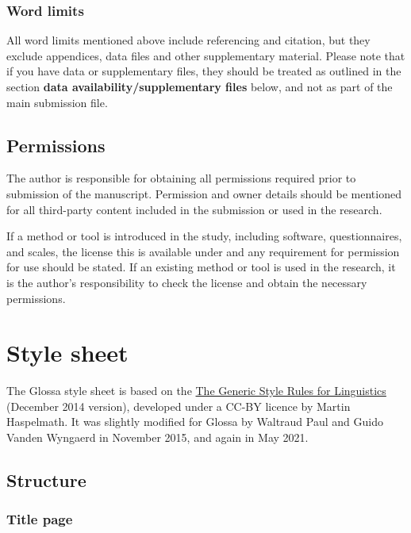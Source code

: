 \documentclass[]{glossa}
\begin{document}
\hypertarget{word-limits}{%
\subsubsection{Word limits}\label{word-limits}}

All word limits mentioned above include referencing and citation, but
they exclude appendices, data files and other supplementary material.
Please note that if you have data or supplementary files, they should be
treated as outlined in the section \textbf{data
availability/supplementary files} below, and not as part of the main
submission file.

\hypertarget{permissions}{%
\subsection{Permissions}\label{permissions}}

The author is responsible for obtaining all permissions required prior
to submission of the manuscript. Permission and owner details should be
mentioned for all third-party content included in the submission or used
in the research.

If a method or tool is introduced in the study, including software,
questionnaires, and scales, the license this is available under and any
requirement for permission for use should be stated. If an existing
method or tool is used in the research, it is the author's
responsibility to check the license and obtain the necessary
permissions.

\hypertarget{ss}{%
\section{Style sheet}\label{ss}}

The Glossa style sheet is based on the
\href{http://www.eva.mpg.de/linguistics/past-research-resources/resources/generic-style-rules.html}{The
Generic Style Rules for Linguistics} (December 2014 version), developed
under a CC-BY licence by Martin Haspelmath. It was slightly modified for
Glossa by Waltraud Paul and Guido Vanden Wyngaerd in November 2015, and
again in May 2021.

\hypertarget{structure}{%
\subsection{Structure}\label{structure}}

\hypertarget{title-page}{%
\subsubsection{Title page}\label{title-page}}
\end{document}
